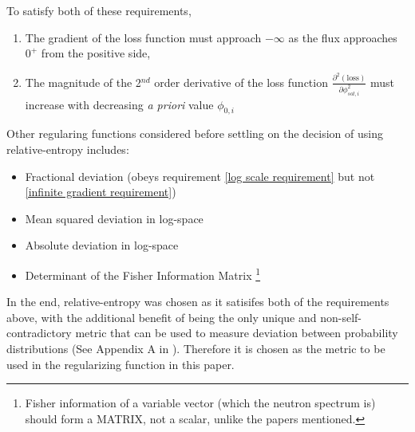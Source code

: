 \documentclass[a4paper, 12pt]{article}
\newcommand{\apriori}[0]{\textit{a priori} }
\begin{document}
    To satisfy both of these requirements,
    \begin{enumerate}
        \item The gradient of the loss function must approach $-\infty$ as the flux approaches $0^+$ from the positive side, \label{infinite gradient requirement}
        \item The magnitude of the 2$^{nd}$ order derivative of the loss function $\frac{\partial^2 (\text{loss})}{\partial \phi_{sol,i}^2}$ must increase with decreasing \apriori value $\phi_{0,i}$ \label{log scale requirement}
    \end{enumerate}

    Other regularing functions considered before settling on the decision of using relative-entropy includes:
    \begin{itemize}
        \item Fractional deviation (obeys requirement \ref{log scale requirement} but not \ref{infinite gradient requirement})
        \item Mean squared deviation in log-space
        \item Absolute deviation in log-space
        \item Determinant of the Fisher Information Matrix \footnote{Fisher information of a variable vector (which the neutron spectrum is) should form a MATRIX, not a scalar, unlike the papers \cite{FisherRegularisation}\cite{FirstResultsOfMFRJETNE213} mentioned.}
    \end{itemize}

    In the end, relative-entropy was chosen as it satisifes both of the requirements above, with the additional benefit of being the only unique and non-self-contradictory metric that can be used to measure deviation between probability distributions (See Appendix A in \cite{MAXED1998Reginatto}). Therefore it is chosen as the metric to be used in the regularizing function in this paper.
\end{document}
